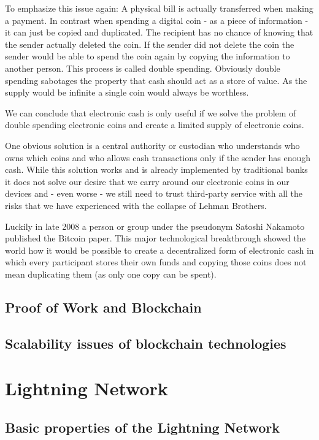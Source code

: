 \documentclass[ebook,12pt,oneside,openany]{memoir}
\begin{document}
To emphasize this issue again: A physical bill is actually transferred when making a payment. In contrast when spending a digital coin - as a piece of information - it can just be copied and duplicated.
The recipient has no chance of knowing that the sender actually deleted the coin.
If the sender did not delete the coin the sender would be able to spend the coin again by copying the information to another person.
This process is called double spending.
Obviously double spending sabotages the property that cash should act as a store of value. As the supply would be infinite a single coin would always be worthless. 

We can conclude that electronic cash is only useful if we solve the problem of double spending electronic coins and create a limited supply of electronic coins.

One obvious solution is a central authority or custodian who understands who owns which coins and who allows cash transactions only if the sender has enough cash.
While this solution works and is already implemented by traditional banks it does not solve our desire that we carry around our electronic coins in our devices and - even worse - we still need to trust third-party service with all the risks that we have experienced with the collapse of Lehman Brothers.

Luckily in late 2008 a person or group under the pseudonym Satoshi Nakamoto published the Bitcoin paper.
This major technological breakthrough showed the world how it would be possible to create a decentralized form of electronic cash in which every participant stores their own funds and copying those coins does not mean duplicating them (as only one copy can be spent).

\section{Proof of Work and Blockchain}
\section{Scalability issues of blockchain technologies}
\chapter{Lightning Network}
\section{Basic properties of the Lightning Network}
\end{document}
